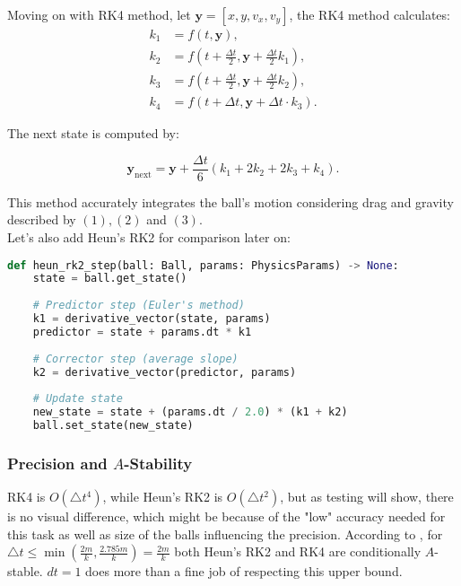 \documentclass{article}
\begin{document}
	Moving on with RK4 method, let $\mathbf{y} = [x, y, v_x, v_y]$, the RK4 method calculates:
	\begin{align*}
		k_1 &= f(t, \mathbf{y}), \\
		k_2 &= f\left(t + \frac{\Delta t}{2}, \mathbf{y} + \frac{\Delta t}{2} k_1\right), \\
		k_3 &= f\left(t + \frac{\Delta t}{2}, \mathbf{y} + \frac{\Delta t}{2} k_2\right), \\
		k_4 &= f\left(t + \Delta t, \mathbf{y} + \Delta t \cdot k_3\right).
	\end{align*}
	
	The next state is computed by:
	
	\begin{equation}
		\mathbf{y}_{\text{next}} = \mathbf{y} + \frac{\Delta t}{6} (k_1 + 2k_2 + 2k_3 + k_4).
	\end{equation}
	
	This method accurately integrates the ball's motion considering drag and gravity described by $(1), (2)$ and $(3)$. \\
	
	Let's also add Heun's RK2 for comparison later on:
	
\begin{lstlisting}[language=python]
def heun_rk2_step(ball: Ball, params: PhysicsParams) -> None:
	state = ball.get_state()
	
	# Predictor step (Euler's method)
	k1 = derivative_vector(state, params)
	predictor = state + params.dt * k1
	
	# Corrector step (average slope)
	k2 = derivative_vector(predictor, params)
	
	# Update state
	new_state = state + (params.dt / 2.0) * (k1 + k2)
	ball.set_state(new_state)
\end{lstlisting}	

	\subsubsection*{Precision and $A$-Stability}

	RK4 is $O(\triangle t^4)$, while Heun's RK2 is $O(\triangle t^2)$, but as testing will show, there is no visual difference, which might be because of the "low" accuracy needed for this task as well as size of the balls influencing the precision. According to \cite{Astab}, for $\triangle t \leq \min (\frac{2m}{k}, \frac{2.785m}{k}) = \frac{2m}{k}$ both Heun's RK2 and RK4 are conditionally $A$-stable. $dt = 1$ does more than a fine job of respecting this upper bound. \\
\end{document}
